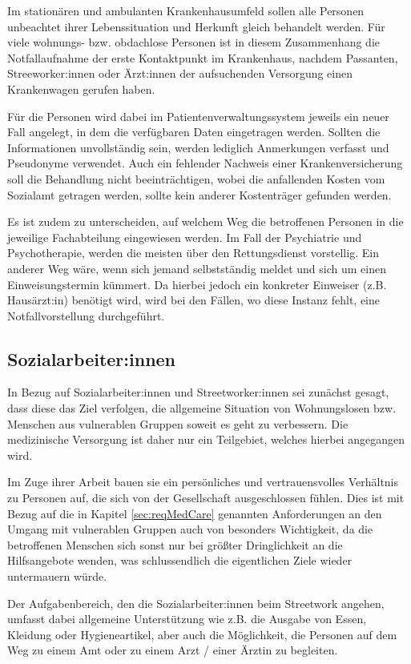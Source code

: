 Im stationären und ambulanten Krankenhausumfeld sollen alle Personen unbeachtet ihrer Lebenssituation und Herkunft gleich behandelt werden. Für viele wohnungs- bzw. obdachlose Personen ist in diesem Zusammenhang die Notfallaufnahme der erste Kontaktpunkt im Krankenhaus, nachdem Passanten, Streeworker:innen oder Ärzt:innen der aufsuchenden Versorgung einen Krankenwagen gerufen haben.

Für die Personen wird dabei im Patientenverwaltungssystem jeweils ein neuer Fall angelegt, in dem die verfügbaren Daten eingetragen werden. Sollten die Informationen unvollständig sein, werden lediglich Anmerkungen verfasst und Pseudonyme verwendet. Auch ein fehlender Nachweis einer Krankenversicherung soll die Behandlung nicht beeinträchtigen, wobei die anfallenden Kosten vom Sozialamt getragen werden, sollte kein anderer Kostenträger gefunden werden.

Es ist zudem zu unterscheiden, auf welchem Weg die betroffenen Personen in die jeweilige Fachabteilung eingewiesen werden. Im Fall der Psychiatrie und Psychotherapie, werden die meisten über den Rettungsdienst vorstellig. Ein anderer Weg wäre, wenn sich jemand selbstständig meldet und sich um einen Einweisungstermin kümmert. Da hierbei jedoch ein konkreter Einweiser (z.B. Hausärzt:in) benötigt wird, wird bei den Fällen, wo diese Instanz fehlt, eine Notfallvorstellung durchgeführt.

\subsection{Sozialarbeiter:innen}

In Bezug auf Sozialarbeiter:innen und Streetworker:innen sei zunächst gesagt, dass diese das Ziel verfolgen, die allgemeine Situation von Wohnungslosen bzw. Menschen aus vulnerablen Gruppen soweit es geht zu verbessern. Die medizinische Versorgung ist daher nur ein Teilgebiet, welches hierbei angegangen wird.

Im Zuge ihrer Arbeit bauen sie ein persönliches und vertrauensvolles Verhältnis zu Personen auf, die sich von der Gesellschaft ausgeschlossen fühlen. Dies ist mit Bezug auf die in Kapitel \ref{sec:reqMedCare} genannten Anforderungen an den Umgang mit vulnerablen Gruppen auch von besonders Wichtigkeit, da die betroffenen Menschen sich sonst nur bei größter Dringlichkeit an die Hilfsangebote wenden, was schlussendlich die eigentlichen Ziele wieder untermauern würde.

Der Aufgabenbereich, den die Sozialarbeiter:innen beim Streetwork angehen, umfasst dabei allgemeine Unterstützung wie z.B. die Ausgabe von Essen, Kleidung oder Hygieneartikel, aber auch die Möglichkeit, die Personen auf dem Weg zu einem Amt oder zu einem Arzt / einer Ärztin zu begleiten.


